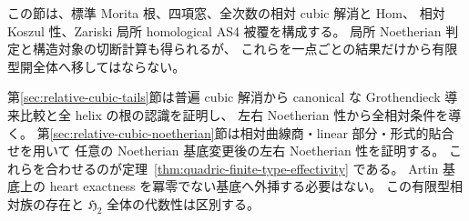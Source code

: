 \begin{remark}[有限型相対実現への依存関係]
この節は、標準 Morita 根、四項窓、全次数の相対 cubic 解消と Hom、
相対 Koszul 性、Zariski 局所 homological AS4 被覆を構成する。
局所 Noetherian 判定と構造対象の切断計算も得られるが、
これらを一点ごとの結果だけから有限型開全体へ移してはならない。

第\ref{sec:relative-cubic-tails}節は普遍 cubic 解消から
canonical な Grothendieck 導来比較と全 helix の根の認識を証明し、
左右 Noetherian 性から全相対条件を導く。
第\ref{sec:relative-cubic-noetherian}節は相対曲線商・linear 部分・形式的貼合せを用いて
任意の Noetherian 基底変更後の左右 Noetherian 性を証明する。
これらを合わせるのが定理~\ref{thm:quadric-finite-type-effectivity} である。
Artin 基底上の heart exactness を冪零でない基底へ外挿する必要はない。
この有限型相対族の存在と $\mathfrak H_2$ 全体の代数性は区別する。
\end{remark}
